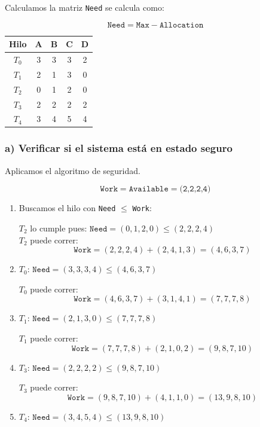 \documentclass[12pt,letterpaper]{article}
\begin{document}
\bigskip

Calculamos la matriz \texttt{Need} se calcula como:

\[
\texttt{Need} = \texttt{Max} - \texttt{Allocation}
\]

\begin{center}
  \begin{tabular}{c|cccc}
    Hilo & A & B & C & D \\
    \midrule
    $T_0$ & 3&3&3&2 \\
    $T_1$ & 2&1&3&0 \\
    $T_2$ & 0&1&2&0 \\
    $T_3$ & 2&2&2&2 \\
    $T_4$ & 3&4&5&4 \\
  \end{tabular}
\end{center}

\subsubsection*{a) Verificar si el sistema está en estado seguro}

Aplicamos el algoritmo de seguridad.

\[
\texttt{Work} = \texttt{Available} = \texttt{(2,2,2,4)}
\]

\begin{enumerate}[label=\arabic*${}^\circ$]
\item Buscamos el hilo con \texttt{Need} $\leq$ \texttt{Work}:

  $T_2$ lo cumple pues: $\texttt{Need} = (0,1,2,0) \leq (2,2,2,4)$\\
  
  $T_2$ puede correr:
  \[
  \texttt{Work} = (2,2,2,4) + (2,4,1,3) = (4,6,3,7)
  \]

\item $T_0$: $\texttt{Need} = (3,3,3,4) \leq (4,6,3,7)$
  
  $T_0$ puede correr:
  \[
  \texttt{Work} = (4,6,3,7) + (3,1,4,1) = (7,7,7,8)
  \]

\item $T_1$: $\texttt{Need} = (2,1,3,0) \leq (7,7,7,8)$

  $T_1$ puede correr:
  \[
  \texttt{Work} = (7,7,7,8) + (2,1,0,2) = (9,8,7,10)
  \]

\item $T_3$: $\texttt{Need} = (2,2,2,2) \leq (9,8,7,10)$

  $T_3$ puede correr:
  \[
  \texttt{Work} = (9,8,7,10) + (4,1,1,0) = (13,9,8,10)
  \]
  
\item $T_4$: $\texttt{Need} = (3,4,5,4) \leq (13,9,8,10)$
\end{enumerate}
\end{document}
